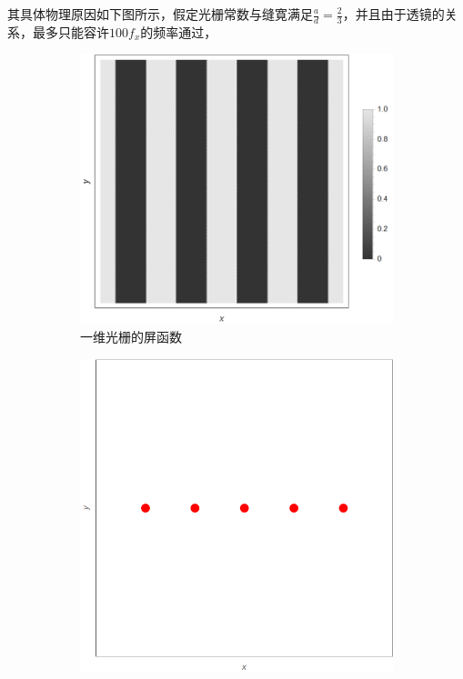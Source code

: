 \documentclass[a4paper]{article}
\begin{document}
\hspace{2em} 其具体物理原因如下图所示，假定光栅常数与缝寛满足$\frac{a}{d}=\frac{2}{3}$，并且由于透镜的关系，最多只能容许$100f_x$的频率通过，\par
\begin{figure}[H]
    \centering
    \begin{subfigure}[t]{0.45\textwidth}
        \centering
        \includegraphics[height=\textheight/4]{simu/lightgate.png}
        \caption{一维光栅的屏函数}
        \label{fig3-1}
    \end{subfigure}
    \begin{subfigure}[t]{0.45\textwidth}
        \centering
        \includegraphics[height=\textheight/4]{simu/frelg.png}

\end{subfigure}
\end{figure}
\end{document}
